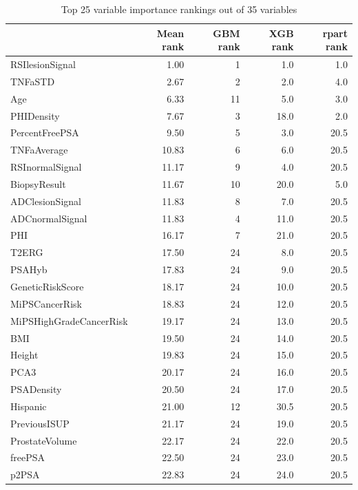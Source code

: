 \documentclass[]{article}
\begin{document}
\begin{table}

\caption{\label{tab:unnamed-chunk-16}Top 25 variable importance rankings out of 35 variables}
\centering
\begin{tabular}[t]{l|r|r|r|r}
\hline
  & Mean rank & GBM rank & XGB rank & rpart rank\\
\hline
RSIlesionSignal & 1.00 & 1 & 1.0 & 1.0\\
\hline
TNFaSTD & 2.67 & 2 & 2.0 & 4.0\\
\hline
Age & 6.33 & 11 & 5.0 & 3.0\\
\hline
PHIDensity & 7.67 & 3 & 18.0 & 2.0\\
\hline
PercentFreePSA & 9.50 & 5 & 3.0 & 20.5\\
\hline
TNFaAverage & 10.83 & 6 & 6.0 & 20.5\\
\hline
RSInormalSignal & 11.17 & 9 & 4.0 & 20.5\\
\hline
BiopsyResult & 11.67 & 10 & 20.0 & 5.0\\
\hline
ADClesionSignal & 11.83 & 8 & 7.0 & 20.5\\
\hline
ADCnormalSignal & 11.83 & 4 & 11.0 & 20.5\\
\hline
PHI & 16.17 & 7 & 21.0 & 20.5\\
\hline
T2ERG & 17.50 & 24 & 8.0 & 20.5\\
\hline
PSAHyb & 17.83 & 24 & 9.0 & 20.5\\
\hline
GeneticRiskScore & 18.17 & 24 & 10.0 & 20.5\\
\hline
MiPSCancerRisk & 18.83 & 24 & 12.0 & 20.5\\
\hline
MiPSHighGradeCancerRisk & 19.17 & 24 & 13.0 & 20.5\\
\hline
BMI & 19.50 & 24 & 14.0 & 20.5\\
\hline
Height & 19.83 & 24 & 15.0 & 20.5\\
\hline
PCA3 & 20.17 & 24 & 16.0 & 20.5\\
\hline
PSADensity & 20.50 & 24 & 17.0 & 20.5\\
\hline
Hispanic & 21.00 & 12 & 30.5 & 20.5\\
\hline
PreviousISUP & 21.17 & 24 & 19.0 & 20.5\\
\hline
ProstateVolume & 22.17 & 24 & 22.0 & 20.5\\
\hline
freePSA & 22.50 & 24 & 23.0 & 20.5\\
\hline
p2PSA & 22.83 & 24 & 24.0 & 20.5\\
\hline
\end{tabular}
\end{table}
\end{document}
